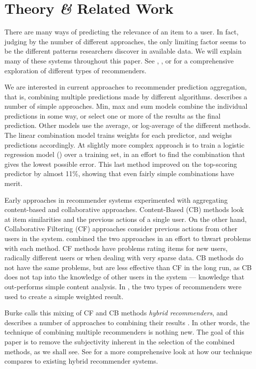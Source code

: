 \section{Theory \emph{\&} Related Work}

There are many ways of predicting the
relevance of an item to a user. 
In fact, judging by the number of different approaches,
the only limiting factor seems to be the different 
patterns researchers discover in available data.
We will explain many of these systems throughout this paper.
See 
\cite{Adomavicius2005}, \cite{Pazzani2007}, \cite{Schafer2007} 
or \cite{Bjorkoy2010d} for a comprehensive exploration 
of different types of recommenders.

We are interested in current approaches to recommender prediction aggregation,
that is, combining multiple predictions made by different algorithms.
\cite{Aslam2001} describes a number of simple approaches.
Min, max and sum models combine the individual predictions in some way, 
or select one or more of the results as the final prediction. 
Other models use the average, or log-average of the different methods.
The linear combination model trains weights for each predictor, and weighs predictions accordingly.
At slightly more complex approach is to train a logistic regression model (\cite[p3]{Aslam2001})
over a training set, in an effort to find the combination that gives the lowest possible error.
This last method improved on the top-scoring predictor by almost 11\%,
showing that even fairly simple combinations have merit.

Early approaches in recommender systems experimented with aggregating content-based and collaborative approaches.
Content-Based (CB) methods look at item similarities and the previous actions of a single user.
On the other hand, Collaborative Filtering (CF) approaches consider
previous actions from other users in the system.
\cite{Claypool1999} combined the two approaches in an effort to thwart problems with each method.
CF methods have problems rating items for new users, radically different users or when dealing with very sparse data.
CB methods do not have the same problems, but are less effective than CF in the long run, as CB does not tap into the 
knowledge of other users in the system --- knowledge that out-performs simple content analysis.
In \cite{Claypool1999}, the two types of recommenders were used to create a simple weighted result.

Burke calls this mixing of CF and CB methods \emph{hybrid recommenders},
and describes a number of approaches to combining their results \cite[p.4]{Burke2007}.
In other words, the technique of combining multiple recommenders is nothing new.
The goal of this paper is to remove the subjectivity inherent in the
selection of the combined methods, as we shall see.
See \cite{Bjorkoy2010d} for a more comprehensive look at how
our technique compares to existing hybrid recommender systems. 

